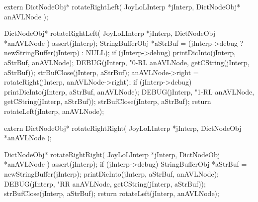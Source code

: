 \startCHeader
extern DictNodeObj* rotateRightLeft(
  JoyLoLInterp *jInterp,
  DictNodeObj* anAVLNode
);
\stopCHeader

\startCCode
DictNodeObj* rotateRightLeft(
  JoyLoLInterp *jInterp,
  DictNodeObj      *anAVLNode
) {
  assert(jInterp);
  StringBufferObj *aStrBuf =
    (jInterp->debug ? newStringBuffer(jInterp) : NULL);
  if (jInterp->debug) {
    printDicInto(jInterp, aStrBuf, anAVLNode);
    DEBUG(jInterp, "0-RL %
      anAVLNode, getCString(jInterp, aStrBuf));
    strBufClose(jInterp, aStrBuf);
  }
  anAVLNode->right = rotateRight(jInterp, anAVLNode->right);
  if (jInterp->debug) {
    printDicInto(jInterp, aStrBuf, anAVLNode);
    DEBUG(jInterp, "1-RL %
      anAVLNode, getCString(jInterp, aStrBuf));
    strBufClose(jInterp, aStrBuf);
  }
  return rotateLeft(jInterp, anAVLNode);
}
\stopCCode

\startCHeader
extern DictNodeObj* rotateRightRight(
  JoyLoLInterp *jInterp,
  DictNodeObj      *anAVLNode
);
\stopCHeader

\startCCode
DictNodeObj* rotateRightRight(
  JoyLoLInterp *jInterp,
  DictNodeObj      *anAVLNode
) {
  assert(jInterp);
  if (jInterp->debug) {
    StringBufferObj *aStrBuf = newStringBuffer(jInterp);
    printDicInto(jInterp, aStrBuf, anAVLNode);
    DEBUG(jInterp, "RR %
      anAVLNode, getCString(jInterp, aStrBuf));
    strBufClose(jInterp, aStrBuf);
  }
  return rotateLeft(jInterp, anAVLNode);
}
\stopCCode

